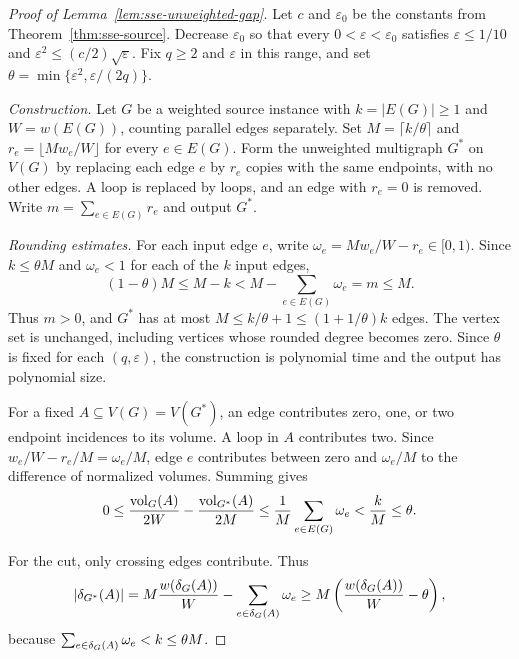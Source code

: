 \begin{proof}[Proof of Lemma~\ref{lem:sse-unweighted-gap}]
Let $c$ and $\varepsilon_0$ be the constants from
Theorem~\ref{thm:sse-source}. Decrease $\varepsilon_0$ so that every
$0<\varepsilon<\varepsilon_0$ satisfies $\varepsilon\leq1/10$ and
$\varepsilon^2\leq(c/2)\sqrt\varepsilon$.
Fix $q\geq2$ and $\varepsilon$ in this range, and set
$\theta=\min\{\varepsilon^2,\varepsilon/(2q)\}$.

\emph{Construction.}
Let $G$ be a weighted source instance with $k=|E(G)|\geq1$ and
$W=w(E(G))$, counting parallel edges separately.
Set $M=\lceil k/\theta\rceil$ and
$r_e=\lfloor Mw_e/W\rfloor$ for every $e\in E(G)$.
Form the unweighted multigraph $G^*$ on $V(G)$ by replacing each
edge $e$ by $r_e$ copies with the same endpoints, with no other edges.
A loop is replaced by loops, and an edge with $r_e=0$ is removed.
Write $m=\sum_{e\in E(G)}r_e$ and output $G^*$.

\emph{Rounding estimates.}
For each input edge $e$, write $\omega_e=Mw_e/W-r_e\in[0,1)$.
Since $k\leq\theta M$ and $\omega_e<1$ for each of the $k$ input edges,
\begin{equation}\label{eq:sse-round-edge-count}
 (1-\theta)M\leq M-k<M-\sum_{e\in E(G)}\omega_e=m\leq M.
\end{equation}
Thus $m>0$, and $G^*$ has at most
$M\leq k/\theta+1\leq(1+1/\theta)k$ edges.
The vertex set is unchanged, including vertices whose rounded degree
becomes zero. Since $\theta$ is fixed for each $(q,\varepsilon)$,
the construction is polynomial time and the output has polynomial size.

For a fixed $A\subseteq V(G)=V(G^*)$, an edge contributes zero, one, or two
endpoint incidences to its volume. A loop in $A$ contributes two.
Since $w_e/W-r_e/M=\omega_e/M$, edge $e$ contributes between zero
and $\omega_e/M$ to the difference of normalized volumes. Summing gives
\begin{equation}\label{eq:round-volume}
 0\leq\frac{\operatorname{vol}_G(A)}{2W}
       -\frac{\operatorname{vol}_{G^*}(A)}{2M}
 \leq\frac1M\sum_{e\in E(G)}\omega_e
 <\frac{k}{M}\leq\theta.
\end{equation}

For the cut, only crossing edges contribute. Thus
\begin{equation}\label{eq:round-cut}
  |\delta_{G^*}(A)|
  =M\frac{w(\delta_G(A))}{W}-\sum_{e\in\delta_G(A)}\omega_e
  \geq M\left(\frac{w(\delta_G(A))}{W}-\theta\right),
\end{equation}
because $\sum_{e\in\delta_G(A)}\omega_e<k\leq\theta M$.


\end{proof}

